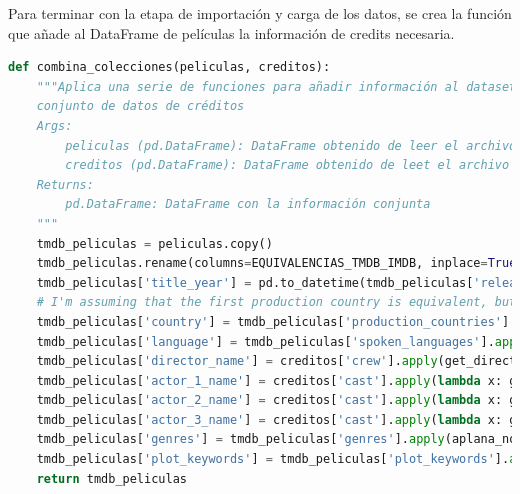Para terminar con la etapa de importación y carga de los datos, se crea la función que añade al DataFrame de películas la información de credits necesaria.
\begin{lstlisting}[language=Python, caption= {El conjunto de datos se encuentra en dos ficheros separados y con estructuras diferentes. Esta función tiene como finalidad juntar esas dos colecciones un un único conjunto de datos. Para ello, se definen unas equivalencias entre columnas y una forma de juntarlas.}]
def combina_colecciones(peliculas, creditos):
    """Aplica una serie de funciones para añadir información al dataset de películas a partir del
    conjunto de datos de créditos
    Args:
        peliculas (pd.DataFrame): DataFrame obtenido de leer el archivo de películas
        creditos (pd.DataFrame): DataFrame obtenido de leet el archivo de créditos
    Returns:
        pd.DataFrame: DataFrame con la información conjunta
    """
    tmdb_peliculas = peliculas.copy()
    tmdb_peliculas.rename(columns=EQUIVALENCIAS_TMDB_IMDB, inplace=True)
    tmdb_peliculas['title_year'] = pd.to_datetime(tmdb_peliculas['release_date']).apply(lambda x: x.year)
    # I'm assuming that the first production country is equivalent, but have not been able to validate this
    tmdb_peliculas['country'] = tmdb_peliculas['production_countries'].apply(lambda x: get_elemento(x, [0, 'name']))
    tmdb_peliculas['language'] = tmdb_peliculas['spoken_languages'].apply(lambda x: get_elemento(x, [0, 'name']))
    tmdb_peliculas['director_name'] = creditos['crew'].apply(get_director)
    tmdb_peliculas['actor_1_name'] = creditos['cast'].apply(lambda x: get_elemento(x, [1, 'name']))
    tmdb_peliculas['actor_2_name'] = creditos['cast'].apply(lambda x: get_elemento(x, [2, 'name']))
    tmdb_peliculas['actor_3_name'] = creditos['cast'].apply(lambda x: get_elemento(x, [3, 'name']))
    tmdb_peliculas['genres'] = tmdb_peliculas['genres'].apply(aplana_nombres)
    tmdb_peliculas['plot_keywords'] = tmdb_peliculas['plot_keywords'].apply(aplana_nombres)
    return tmdb_peliculas
\end{lstlisting}

